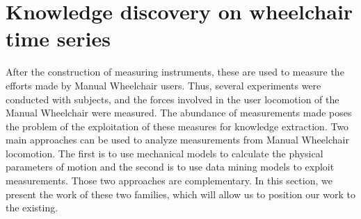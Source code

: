\section{Knowledge discovery on wheelchair time series}
After the construction of measuring instruments, these are used to measure the efforts made by Manual Wheelchair users. Thus, several experiments were conducted with subjects, and the forces involved in the user locomotion of the Manual Wheelchair were measured. The abundance of measurements made poses the problem of the exploitation of these measures for knowledge extraction. Two main approaches can be used to analyze measurements from Manual Wheelchair locomotion. The first is to use mechanical models to calculate the physical parameters of motion and the second is to use data mining models to exploit measurements. Those two approaches are complementary. In this section, we present the work of these two families, which will allow us to position our work to the existing.



